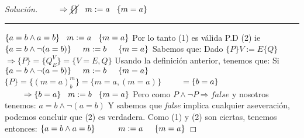 \begin{proof}[Solución]
\newline
$ \hspace*{0.8cm} \Rightarrow  \cancel{\{ \}} \hspace*{0.3cm} m:=a \hspace*{0.3cm} \{ m=a \} $
\newline
\noindent\rule{6cm}{0.4pt}
\newline
$ \{a=b \wedge a=b \} \hspace*{0.3cm}  m:=a \hspace*{.3cm} \{m=a \}$
\vspace*{0.3cm}
\newline
Por lo tanto (1) es válida
\vspace*{0.5cm}
\newline
P.D (2) ie $\{a=b \wedge \neg (a=b) \} \hspace*{.5cm}  m:=b \hspace*{.5cm} \{m=a \}  $ 
\newline
Sabemos que:
\newline
Dado $\{P\} V:=E \{Q\}$
\newline
$\Rightarrow  \{P\} = \{Q_{E}^{V} \} = \{V=E, Q \} $
\vspace*{0.3cm}
\newline
Usando la definición anterior, tenemos que:
Si $\{a=b \wedge \neg (a=b) \} \hspace*{.5cm}  m:=b \hspace*{.5cm} \{m=a \} $  
\newline
$ \{ P \} = \{ (m=a)_{b}^{m}   \} = \{m=a,(m=a)\} $
\newline
$ \hspace*{0.8cm} = \{ b=a \} $
\newline
$ \hspace*{0.8cm} \Rightarrow  \{ b=a \} \hspace*{0.3cm} m:=b \hspace*{0.3cm} \{ m=a \} $
\vspace*{0.3cm}
\newline
Pero como $P \wedge \neg P \Rightarrow false $ y nosotros tenemos: $a=b \wedge \neg (a=b) $
\newline 
Y sabemos que \emph{false} implica cualquier aseveración, podemos concluir que (2) es verdadera.
\vspace*{0.3cm}
\newline
Como (1) y (2) son ciertas, tenemos entonces:
\vspace*{0.3cm}
\newline
$ \{a=b \wedge a=b \} \hspace*{1cm}  m:=a \hspace*{.5cm} \{m=a \} $

\end{proof}
